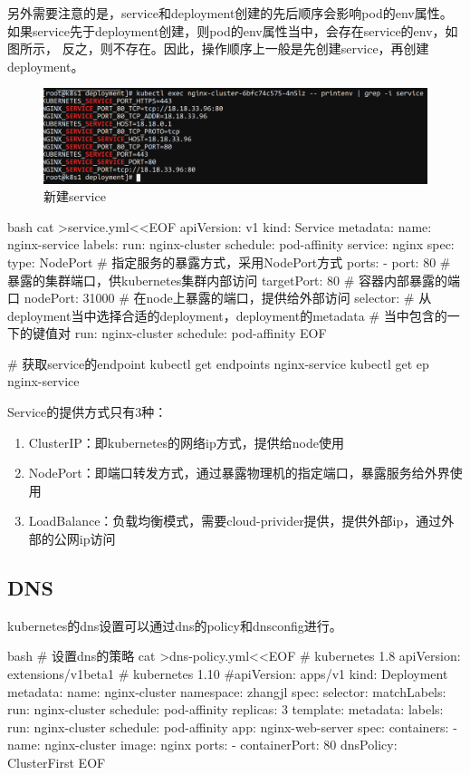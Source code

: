 另外需要注意的是，service和deployment创建的先后顺序会影响pod的env属性。
如果service先于deployment创建，则pod的env属性当中，会存在service的env，如图所示，
反之，则不存在。因此，操作顺序上一般是先创建service，再创建deployment。
\begin{figure}[H]
  \centering
  \includegraphics[scale=0.3]{k8s_service.png}
  \caption{新建service}
  \label{fig:k8s_service}
\end{figure}

\begin{code-block}{bash}
cat >service.yml<<EOF
apiVersion: v1
kind: Service
metadata:
  name: nginx-service
  labels:
    run: nginx-cluster
    schedule: pod-affinity
    service: nginx
spec:
  type: NodePort # 指定服务的暴露方式，采用NodePort方式
  ports:
  - port: 80        # 暴露的集群端口，供kubernetes集群内部访问
    targetPort: 80  # 容器内部暴露的端口
    nodePort: 31000 # 在node上暴露的端口，提供给外部访问
  selector: # 从deployment当中选择合适的deployment，deployment的metadata
            # 当中包含的一下的键值对
    run: nginx-cluster
    schedule: pod-affinity
EOF

# 获取service的endpoint
kubectl get endpoints nginx-service
kubectl get ep nginx-service
\end{code-block}
Service的提供方式只有3种：
\begin{enumerate}
    \item ClusterIP：即kubernetes的网络ip方式，提供给node使用
    \item NodePort：即端口转发方式，通过暴露物理机的指定端口，暴露服务给外界使用
    \item LoadBalance：负载均衡模式，需要cloud-privider提供，提供外部ip，通过外部的公网ip访问
\end{enumerate}

\subsection{DNS}
kubernetes的dns设置可以通过dns的policy和dnsconfig进行。
\begin{code-block}{bash}
# 设置dns的策略
cat >dns-policy.yml<<EOF
# kubernetes 1.8
apiVersion: extensions/v1beta1
# kubernetes 1.10
#apiVersion: apps/v1
kind: Deployment
metadata:
  name: nginx-cluster
  namespace: zhangjl
spec:
  selector:
    matchLabels:
      run: nginx-cluster
      schedule: pod-affinity
  replicas: 3
  template:
    metadata:
      labels:
        run: nginx-cluster
        schedule: pod-affinity
        app: nginx-web-server
    spec:
      containers:
      - name: nginx-cluster
        image: nginx
        ports:
        - containerPort: 80
      dnsPolicy: ClusterFirst
EOF
\end{code-block}

